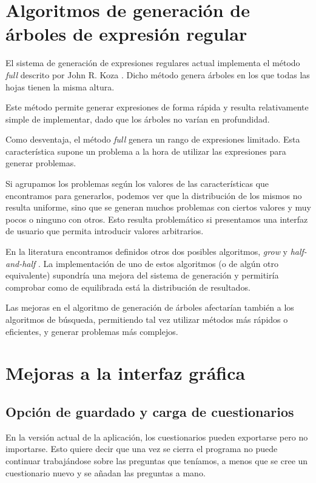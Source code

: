 
\section{Algoritmos de generación de árboles de expresión regular}
El sistema de generación de expresiones regulares actual implementa el método \emph{full} descrito por John R. Koza \cite{koza92}.
Dicho método genera árboles en los que todas las hojas tienen la misma altura.

Este método permite generar expresiones de forma rápida y resulta relativamente simple de implementar, dado que los árboles no varían en profundidad.

Como desventaja, el método \emph{full} genera un rango de expresiones limitado.
Esta característica supone un problema a la hora de utilizar las expresiones para generar problemas.

Si agrupamos los problemas según los valores de las características que encontramos para generarlos, podemos ver que la distribución de los mismos no resulta uniforme, sino que se generan muchos problemas con ciertos valores y muy pocos o ninguno con otros.
Esto resulta problemático si presentamos una interfaz de usuario que permita introducir valores arbitrarios.

En la literatura encontramos definidos otros dos posibles algoritmos, \emph{grow} y \emph{half-and-half} \cite{koza92}.
La implementación de uno de estos algoritmos (o de algún otro equivalente) supondría una mejora del sistema de generación y permitiría comprobar como de equilibrada está la distribución de resultados.

Las mejoras en el algoritmo de generación de árboles afectarían también a los algoritmos de búsqueda, permitiendo tal vez utilizar métodos más rápidos o eficientes, y generar problemas más complejos.

\section{Mejoras a la interfaz gráfica}
\subsection{Opción de guardado y carga de cuestionarios}
En la versión actual de la aplicación, los cuestionarios pueden exportarse pero no importarse.
Esto quiere decir que una vez se cierra el programa no puede continuar trabajándose sobre las preguntas que teníamos, a menos que se cree un cuestionario nuevo y se añadan las preguntas a mano.

